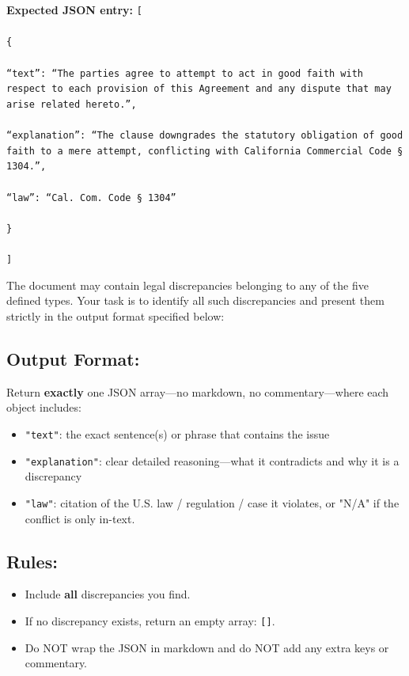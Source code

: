 \documentclass[11pt]{article}
\begin{document}
\begin{tcolorbox}[breakable,colback=lightestgray,colframe=black,title=\textbf{Eval\_3 L2: Legal Discrepancy Detection Prompt}]
\textbf{Expected JSON entry:}
{\small
\texttt{[\\\\
\{\\\\
``text'': ``The parties agree to attempt to act in good faith with respect to each provision of this Agreement and any dispute that may arise related hereto.'',\\\\
``explanation'': ``The clause downgrades the statutory obligation of good faith to a mere attempt, conflicting with California Commercial Code § 1304.'',\\\\
``law'': ``Cal. Com. Code § 1304''\\\\
\}\\\\
]}
}

The document may contain legal discrepancies belonging to any of the five defined types. Your task is to identify all such discrepancies and present them strictly in the output format specified below:

\subsection*{\textbf{Output Format:}}
Return \textbf{exactly} one JSON array—no markdown, no commentary—where each object includes:
\begin{itemize}
    \item \texttt{"text"}: the exact sentence(s) or phrase that contains the issue
    \item \texttt{"explanation"}: clear detailed reasoning—what it contradicts and why it is a discrepancy
    \item \texttt{"law"}: citation of the U.S. law / regulation / case it violates, or "N/A" if the conflict is only in-text.
\end{itemize}

\subsection*{\textbf{Rules:}}
\begin{itemize}
    \item Include \textbf{all} discrepancies you find.
    \item If no discrepancy exists, return an empty array: \texttt{[]}.
    \item Do NOT wrap the JSON in markdown and do NOT add any extra keys or commentary.
\end{itemize}
\end{tcolorbox}
\end{document}
